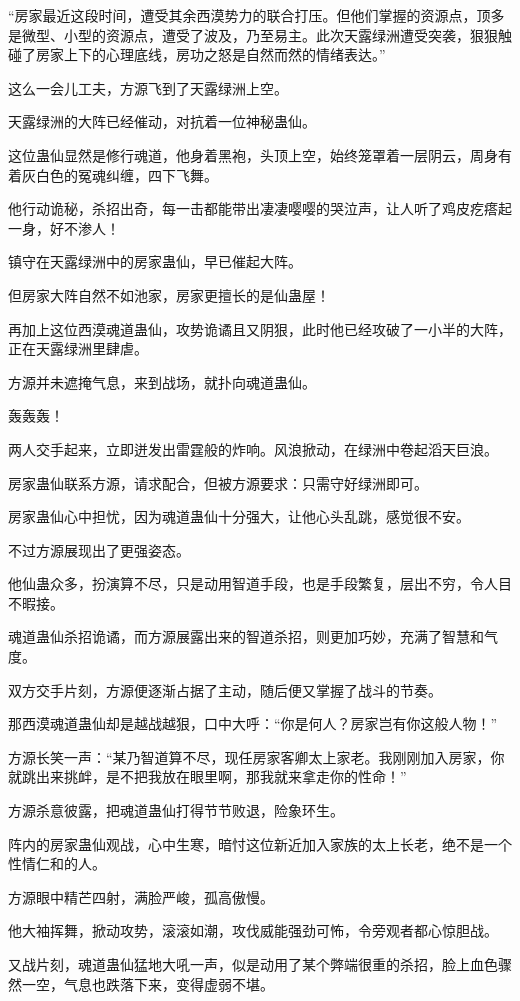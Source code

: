 \begin{this_body}
“房家最近这段时间，遭受其余西漠势力的联合打压。但他们掌握的资源点，顶多是微型、小型的资源点，遭受了波及，乃至易主。此次天露绿洲遭受突袭，狠狠触碰了房家上下的心理底线，房功之怒是自然而然的情绪表达。”

这么一会儿工夫，方源飞到了天露绿洲上空。

天露绿洲的大阵已经催动，对抗着一位神秘蛊仙。

这位蛊仙显然是修行魂道，他身着黑袍，头顶上空，始终笼罩着一层阴云，周身有着灰白色的冤魂纠缠，四下飞舞。

他行动诡秘，杀招出奇，每一击都能带出凄凄嘤嘤的哭泣声，让人听了鸡皮疙瘩起一身，好不渗人！

镇守在天露绿洲中的房家蛊仙，早已催起大阵。

但房家大阵自然不如池家，房家更擅长的是仙蛊屋！

再加上这位西漠魂道蛊仙，攻势诡谲且又阴狠，此时他已经攻破了一小半的大阵，正在天露绿洲里肆虐。

方源并未遮掩气息，来到战场，就扑向魂道蛊仙。

轰轰轰！

两人交手起来，立即迸发出雷霆般的炸响。风浪掀动，在绿洲中卷起滔天巨浪。

房家蛊仙联系方源，请求配合，但被方源要求：只需守好绿洲即可。

房家蛊仙心中担忧，因为魂道蛊仙十分强大，让他心头乱跳，感觉很不安。

不过方源展现出了更强姿态。

他仙蛊众多，扮演算不尽，只是动用智道手段，也是手段繁复，层出不穷，令人目不暇接。

魂道蛊仙杀招诡谲，而方源展露出来的智道杀招，则更加巧妙，充满了智慧和气度。

双方交手片刻，方源便逐渐占据了主动，随后便又掌握了战斗的节奏。

那西漠魂道蛊仙却是越战越狠，口中大呼：“你是何人？房家岂有你这般人物！”

方源长笑一声：“某乃智道算不尽，现任房家客卿太上家老。我刚刚加入房家，你就跳出来挑衅，是不把我放在眼里啊，那我就来拿走你的性命！”

方源杀意彼露，把魂道蛊仙打得节节败退，险象环生。

阵内的房家蛊仙观战，心中生寒，暗忖这位新近加入家族的太上长老，绝不是一个性情仁和的人。

方源眼中精芒四射，满脸严峻，孤高傲慢。

他大袖挥舞，掀动攻势，滚滚如潮，攻伐威能强劲可怖，令旁观者都心惊胆战。

又战片刻，魂道蛊仙猛地大吼一声，似是动用了某个弊端很重的杀招，脸上血色骤然一空，气息也跌落下来，变得虚弱不堪。


\end{this_body}
